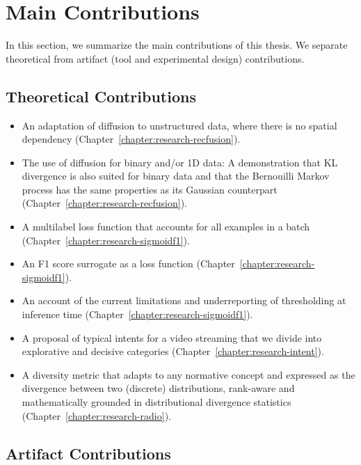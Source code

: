 
\section{Main Contributions}
\label{section:introduction:contributions}

In this section, we summarize the main contributions of this thesis. We separate theoretical from artifact (tool and experimental design) contributions.

\subsection*{Theoretical Contributions}

\begin{itemize}
\item An adaptation of diffusion to unstructured data, where there is no spatial dependency (Chapter~\ref{chapter:research-recfusion}).
\item The use of diffusion for binary and/or 1D data: A demonstration that KL divergence is also suited for binary data and that the Bernouilli Markov process has the same properties as its Gaussian counterpart (Chapter~\ref{chapter:research-recfusion}).
\item A multilabel loss function that accounts for all examples in a batch (Chapter~\ref{chapter:research-sigmoidf1}).
\item An F1 score surrogate as a loss function (Chapter~\ref{chapter:research-sigmoidf1}).
\item An account of the current limitations and underreporting of thresholding at inference time (Chapter~\ref{chapter:research-sigmoidf1}).
\item A proposal of typical intents for a video streaming that we divide into explorative and decisive categories (Chapter~\ref{chapter:research-intent}).
\item A diversity metric that adapts to any normative concept and expressed as the divergence between two (discrete) distributions, rank-aware and mathematically grounded in distributional divergence statistics (Chapter~\ref{chapter:research-radio}).
\end{itemize}

\subsection*{Artifact Contributions}

